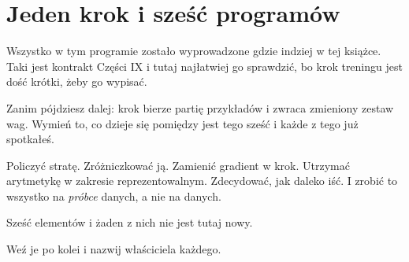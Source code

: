 \section{Jeden krok i sześć programów}
\label{sec:P33-one-step}

\begin{fr}
Wszystko w tym programie zostało wyprowadzone gdzie indziej w tej książce. Taki
jest kontrakt Części IX i tutaj najłatwiej go sprawdzić, bo krok treningu jest
dość krótki, żeby go wypisać.

Zanim pójdziesz dalej: krok bierze partię przykładów i zwraca zmieniony zestaw
wag. Wymień to, co dzieje się pomiędzy \dash{} jest tego sześć i każde z tego
już spotkałeś.
\dotline
\nextframe
\end{fr}

\begin{fr}
\begin{ansblock}
Policzyć stratę. Zróżniczkować ją. Zamienić gradient w krok. Utrzymać
arytmetykę w zakresie reprezentowalnym. Zdecydować, jak daleko iść. I zrobić
to wszystko na \emph{próbce} danych, a nie na danych.
\end{ansblock}

Sześć elementów i żaden z nich nie jest tutaj nowy.
\end{fr}

\begin{fr}
Weź je po kolei i nazwij właściciela każdego.
\dotline
\nextframe
\end{fr}

